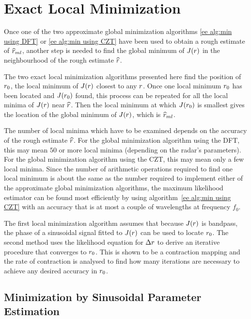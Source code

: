 \section{Exact Local Minimization}
\label{ee sec:elm}


Once one of the two approximate global minimization algorithms 
\ref{ee alg:min using DFT} or \ref{ee alg:min using CZT} have been used to obtain
a rough estimate of $\widehat{r}_{ml}$, another step is needed to find the global
minimum of $J({r})$ in the neighbourhood of the rough estimate $\widehat{r}$.

The two exact local minimization algorithms presented here find the position
of ${r}_0$, the local minimum of $J({r})$ closest to any ${r}$.  
Once one local minimum ${r}_0$ has been located and $J({r}_0)$ found, this
process can be repeated for all the local minima of $J({r})$ near $\widehat{r}$.
Then the local minimum at which $J({r}_0)$ is smallest gives the location of
the global minimum of $J({r})$, which is $\widehat{r}_{ml}$.

The number of local minima which have to be examined depends on the accuracy
of the rough estimate $\widehat{r}$.  For the global minimization algorithm using 
the DFT, this may mean $50$ or more local minima (depending on the radar's
parameters).  For the global minimization algorithm using the CZT,
this may mean only a few local minima.  Since the number of arithmetic
operations required to find one local minimum is about the same as the
number required to implement either of the approximate global minimization
algorithms, the maximum likelihood estimator can be found most efficiently 
by using algorithm~\ref{ee alg:min using CZT} with an accuracy that is 
at most a couple of wavelengths at frequency $f_0$.

The first local minimization algorithm assumes that because $J({r})$ is
bandpass, the phase of a sinusoidal signal fitted to $J({r})$ can be used to
locate ${r}_0$.  The second method uses the likelihood equation for ${\Delta r}$ to
derive an iterative procedure that converges to ${r}_0$.  This is shown to be
a contraction mapping and the rate of contraction is analysed to find
how many iterations are necessary to achieve any desired accuracy in ${r}_0$.

\subsection{Minimization by Sinusoidal Parameter Estimation}

